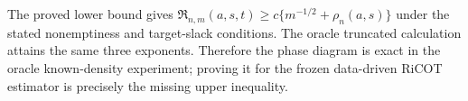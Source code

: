 The proved lower bound gives \(\mathfrak R_{n,m}(a,s,t)\ge c\{m^{-1/2}+\rho_n(a,s)\}\) under the stated nonemptiness and target-slack conditions. The oracle truncated calculation attains the same three exponents. Therefore the phase diagram is exact in the oracle known-density experiment; proving it for the frozen data-driven RiCOT estimator is precisely the missing upper inequality.